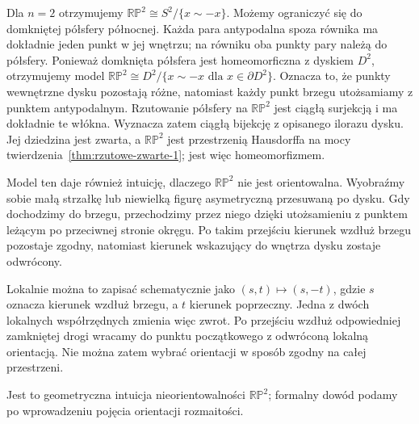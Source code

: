 \begin{uwaga}
Dla $n=2$ otrzymujemy $\mathbb{RP}^2\cong S^2/\{x\sim-x\}$.
Możemy ograniczyć się do domkniętej półsfery północnej. Każda para
antypodalna spoza równika ma dokładnie jeden punkt w jej wnętrzu; na równiku
oba punkty pary należą do półsfery. Ponieważ domknięta półsfera jest
homeomorficzna z dyskiem $D^2$, otrzymujemy model $\mathbb{RP}^2 \cong D^2/\{x\sim-x\text{ dla }x\in\partial D^2\}$.
Oznacza to, że punkty wewnętrzne dysku pozostają różne, natomiast każdy
punkt brzegu utożsamiamy z punktem antypodalnym. Rzutowanie półsfery
na $\mathbb{RP}^2$ jest ciągłą surjekcją i ma dokładnie te włókna.
Wyznacza zatem ciągłą bijekcję z opisanego ilorazu dysku.
Jej dziedzina jest zwarta, a $\mathbb{RP}^2$ jest przestrzenią Hausdorffa
na mocy twierdzenia~\ref{thm:rzutowe-zwarte-1}; jest więc homeomorfizmem.

Model ten daje również intuicję, dlaczego $\mathbb{RP}^2$ nie jest
orientowalna. Wyobraźmy sobie małą strzałkę lub niewielką figurę
asymetryczną przesuwaną po dysku. Gdy dochodzimy do brzegu, przechodzimy
przez niego dzięki utożsamieniu z punktem leżącym po przeciwnej stronie
okręgu. Po takim przejściu kierunek wzdłuż brzegu pozostaje zgodny,
natomiast kierunek wskazujący do wnętrza dysku zostaje odwrócony.

Lokalnie można to zapisać schematycznie jako $(s,t)\longmapsto (s,-t)$,
gdzie $s$ oznacza kierunek wzdłuż brzegu, a $t$ kierunek poprzeczny.
Jedna z dwóch lokalnych współrzędnych zmienia więc zwrot. Po przejściu
wzdłuż odpowiedniej zamkniętej drogi wracamy do punktu początkowego
z odwróconą lokalną orientacją. Nie można zatem wybrać orientacji
w sposób zgodny na całej przestrzeni.

Jest to geometryczna intuicja nieorientowalności $\mathbb{RP}^2$;
formalny dowód podamy po wprowadzeniu pojęcia orientacji rozmaitości.
\end{uwaga}


